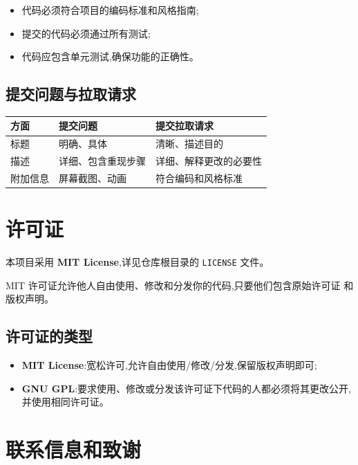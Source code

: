 \documentclass[11pt,a4paper]{article}
\begin{document}
\begin{itemize}
  \item 代码必须符合项目的编码标准和风格指南;
  \item 提交的代码必须通过所有测试;
  \item 代码应包含单元测试,确保功能的正确性。
\end{itemize}

\subsection{提交问题与拉取请求}

\begin{longtable}{@{}lp{5.5cm}p{6cm}@{}}
  \toprule
  方面 & 提交问题 & 提交拉取请求 \\
  \midrule
  标题 & 明确、具体 & 清晰、描述目的 \\
  描述 & 详细、包含重现步骤 & 详细、解释更改的必要性 \\
  附加信息 & 屏幕截图、动画 & 符合编码和风格标准 \\
  \bottomrule
\end{longtable}

\section{许可证}

本项目采用 \textbf{MIT License},详见仓库根目录的 \texttt{LICENSE} 文件。

MIT 许可证允许他人自由使用、修改和分发你的代码,只要他们包含原始许可证
和版权声明。

\subsection{许可证的类型}

\begin{itemize}
  \item \textbf{MIT License}:宽松许可,允许自由使用/修改/分发,保留版权声明即可;
  \item \textbf{GNU GPL}:要求使用、修改或分发该许可证下代码的人都必须将其更改公开,
        并使用相同许可证。
\end{itemize}

\section{联系信息和致谢}
\end{document}
